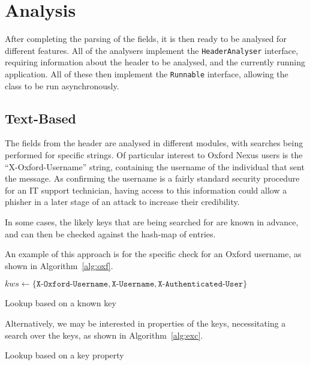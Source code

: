\section{Analysis}

After completing the parsing of the fields, it is then ready to be analysed for
different features.  All of the analysers implement the \texttt{HeaderAnalyser}
interface, requiring information about the header to be analysed, and the
currently running application.  All of these then implement the
\texttt{Runnable} interface, allowing the class to be run asynchronously.

\subsection{Text-Based}

The fields from the header are analysed in different modules, with searches
being performed for specific strings.  Of particular interest to Oxford Nexus
users is the ``X-Oxford-Username'' string, containing the username of the
individual that sent the message.  As confirming the username is a fairly
standard security procedure for an IT support technician, having access to this
information could allow a phisher in a later stage of an attack to increase
their credibility.

In some cases, the likely keys that are being searched for are known in
advance, and can then be checked against the hash-map of entries.

An example of this approach is for the specific check for an Oxford username,
as shown in Algorithm~\ref{alg:oxf}.

\begin{algorithm}
$kws \gets \{\texttt{X-Oxford-Username}, \texttt{X-Username}, \texttt{X-Authenticated-User}\}$\;
	\caption{Lookup based on a known key}
	\label{alg:oxf}
\end{algorithm}

Alternatively, we may be interested in properties of the keys, necessitating a search over the keys, as shown in Algorithm~\ref{alg:exc}.

\begin{algorithm}
	\caption{Lookup based on a key property}
	\label{alg:exc}
\end{algorithm}

